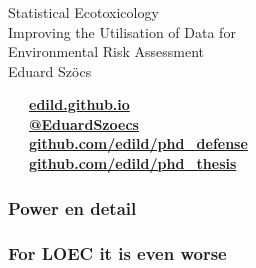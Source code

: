 \documentclass[
	12pt
	]{beamer}
\begin{document}
\begin{frame}[standout]
	\frametitle{}

	\vspace{1em}
	\Huge{Statistical Ecotoxicology} \\[0.3em]
	\normalsize{Improving the Utilisation of Data for \\ Environmental Risk Assessment} \\[1em]

	\footnotesize
	Eduard Szöcs \\[3em]
\begin{flushleft}
	\faLaptop~~~\textbf{\href{http://edild.github.io}{edild.github.io }}\\[.5em]
	\faTwitter~~~\textbf{\href{http://twitter.com/EduardSzoecs}{@EduardSzoecs}} 	\\[0.5em]
	\faFilePowerpointO~~~\textbf{\href{https://github.com/edild/phd_defense}{github.com/edild/phd\_defense}}\\[0.5em]
	\faBook~~~\textbf{\href{https://github.com/edild/phd_thesis}{github.com/edild/phd\_thesis}}\\[3em]
\end{flushleft}

	\begin{center}\ccbysa\end{center} 
\end{frame}




\appendix

\begin{frame}
\frametitle{Power en detail}
	\begin{adjustbox}{max totalsize={\textwidth}{\textheight}}
				
	\end{adjustbox}
\end{frame}


\begin{frame}
\frametitle{For LOEC it is even worse}
	\begin{adjustbox}{max totalsize={\textwidth}{\textheight}}
				
	\end{adjustbox}
\end{frame}
\end{document}
